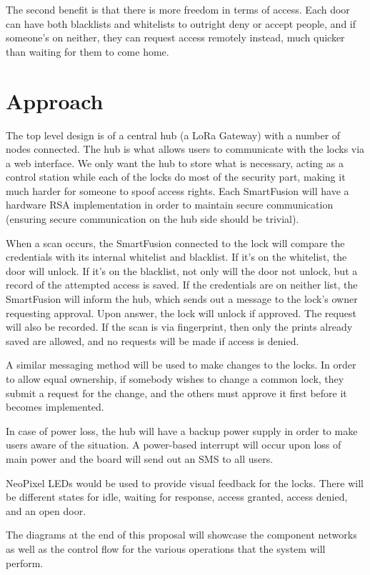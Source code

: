 \documentclass{article}
\begin{document}
The second benefit is that there is more freedom in terms of access. Each door
can have both blacklists and whitelists to outright deny or accept people, and
if someone's on neither, they can request access remotely instead, much quicker
than waiting for them to come home. 

\section{Approach}

The top level design is of a central hub (a LoRa Gateway) with a number of nodes connected. The
hub is what allows users to communicate with the locks via a web interface. We
only want the hub to store what is necessary, acting as a control station while
each of the locks do most of the security part, making it much harder for
someone to spoof access rights. Each SmartFusion will have a hardware RSA
implementation in order to maintain secure communication (ensuring secure
communication on the hub side should be trivial).

When a scan occurs, the SmartFusion connected to the lock will compare the
credentials with its internal whitelist
and blacklist. If it's on the whitelist, the door will unlock. If it's on the
blacklist, not only will the door not unlock, but a record of the attempted
access is saved. If the credentials are on neither list, the SmartFusion will inform the hub,
which sends out a message to the lock's owner requesting approval. Upon
answer, the lock will unlock if approved. The request will also be recorded. If
the scan is via fingerprint, then only the prints already saved are allowed, and
no requests will be made if access is denied.

A similar messaging method will be used to make changes to the locks. In
order to allow equal ownership, if somebody wishes to change a common lock, they
submit a request for the change, and the others must approve it first before it
becomes implemented.

In case of power loss, the hub will have a backup power supply in order to
make users aware of the situation. A power-based interrupt will occur upon loss
of main power and the board will send out an SMS to all users.

NeoPixel LEDs would be used to provide visual feedback for the locks. There will
be different states for idle, waiting for response, access granted, access
denied, and an open door.

The diagrams at the end of this proposal will showcase the component networks as
well as the control flow for the various operations that the system will perform.
\end{document}
